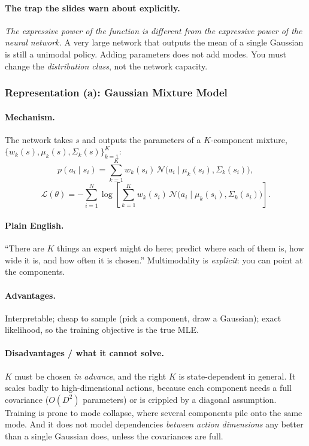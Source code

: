 \documentclass[11pt,a4paper]{article}
\begin{document}
\paragraph{The trap the slides warn about explicitly.} \emph{The expressive
power of the function is different from the expressive power of the neural
network.} A very large network that outputs the mean of a single Gaussian is
still a unimodal policy. Adding parameters does not add modes. You must
change the \emph{distribution class}, not the network capacity.

\subsubsection{Representation (a): Gaussian Mixture Model}

\paragraph{Mechanism.} The network takes $s$ and outputs the parameters of a
$K$-component mixture, $\{w_k(s),\mu_k(s),\Sigma_k(s)\}_{k=1}^{K}$:
\[
p(a_i\mid s_i)=\sum_{k=1}^{K} w_k(s_i)\,\mathcal N\bigl(a_i\mid \mu_k(s_i),\Sigma_k(s_i)\bigr),
\]
\[
\mathcal L(\theta)=-\sum_{i=1}^{N}\log\!\left[\sum_{k=1}^{K} w_k(s_i)\,\mathcal N\bigl(a_i\mid\mu_k(s_i),\Sigma_k(s_i)\bigr)\right].
\]

\paragraph{Plain English.} ``There are $K$ things an expert might do here;
predict where each of them is, how wide it is, and how often it is chosen.''
Multimodality is \emph{explicit}: you can point at the components.

\paragraph{Advantages.} Interpretable; cheap to sample (pick a component, draw
a Gaussian); exact likelihood, so the training objective is the true MLE.

\paragraph{Disadvantages / what it cannot solve.} $K$ must be chosen
\emph{in advance}, and the right $K$ is state-dependent in general. It scales
badly to high-dimensional actions, because each component needs a full
covariance ($O(D^2)$ parameters) or is crippled by a diagonal assumption.
Training is prone to mode collapse, where several components pile onto the
same mode. And it does not model dependencies \emph{between action
dimensions} any better than a single Gaussian does, unless the covariances are
full.
\end{document}
